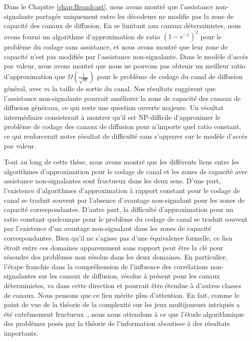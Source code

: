 Dans le Chapitre \ref{chap:Broadcast}, nous avons montré que l'assistance non-signalante partagée uniquement entre les décodeurs ne modifie pas la zone de capacité des canaux de diffusion. En se limitant aux canaux déterministes, nous avons fourni un algorithme d'approximation de ratio $(1-e^{-1})^2$ pour le problème du codage sans assistance, et nous avons montré que leur zone de capacité n'est pas modifiée par l'assistance non-signalante. Dans le modèle d'accès par valeur, nous avons montré que nous ne pouvons pas obtenir un meilleur ratio d'approximation que $\Omega\left(\frac{1}{\sqrt{m}}\right)$ pour le problème de codage du canal de diffusion général, avec $m$ la taille de sortie du canal. Nos résultats suggèrent que l'assistance non-signalante pourrait améliorer la zone de capacité des canaux de diffusion généraux, ce qui reste une question ouverte majeure. Un résultat intermédiaire consisterait à montrer qu'il est \textrm{NP}-difficile d'approximer le problème de codage des canaux de diffusion pour n'importe quel ratio constant, ce qui renforcerait notre résultat de difficulté sans s'appuyer sur le modèle d'accès par valeur.

Tout au long de cette thèse, nous avons montré que les différents liens entre les algorithmes d'approximation pour le codage de canal et les zones de capacité avec assistance non-signalantes sont fructueux dans les deux sens. D'une part, l'existence d'algorithmes d'approximation à rapport constant pour le codage de canal se traduit souvent par l'absence d'avantage non-signalant pour les zones de capacité correspondantes. D'autre part, la difficulté d'approximation pour un ratio constant quelconque pour le problème du codage de canal se traduit souvent par l'existence d'un avantage non-signalant dans les zones de capacité correspondantes. Bien qu'il ne s'agisse pas d'une équivalence formelle, ce lien étroit entre ces domaines apparemment sans rapport peut être la clé pour résoudre des problèmes non résolus dans les deux domaines. En particulier, l'étape franchie dans la compréhension de l'influence des corrélations non-signalantes sur les canaux de diffusion, résolue à présent pour les canaux déterministes, va dans cette direction et pourrait être étendue à d'autres classes de canaux. Nous pensons que ce lien mérite plus d'attention. En fait, comme le point de vue de la théorie de la complexité sur les jeux multijoueurs intriqués a été extrêmement fructueux~\cite{JNVWY20}, nous nous attendons à ce que l'étude algorithmique des problèmes posés par la théorie de l'information aboutisse à des résultats importants.
